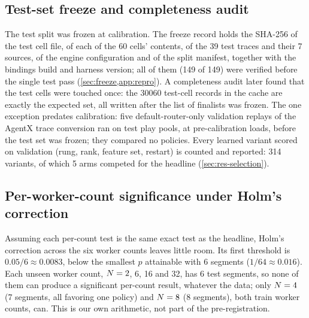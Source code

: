 \subsection{Test-set freeze and completeness audit}

The test split was frozen at calibration. The freeze record holds the SHA-256 of the test cell file,
of each of the 60 cells' contents, of the 39 test traces and their 7 sources, of the engine
configuration and of the split manifest, together with the bindings build and harness version; all
of them (149 of 149) were verified before the single test pass (\cref{sec:freeze,app:repro}).
A completeness audit later found that the test cells were touched once: the \num{30060} test-cell
records in the cache are exactly the expected set, all written after the list of finalists was frozen.
The one exception predates calibration: five default-router-only validation replays of the AgentX
trace conversion ran on test play pools, at pre-calibration loads, before the test set was frozen;
they compared no policies. Every learned variant scored on validation (rung, rank, feature set,
restart) is counted and reported: 314 variants, of which 5 arms competed for the headline
(\cref{sec:res-selection}).

\subsection{Per-worker-count significance under Holm's correction}

Assuming each per-count test is the same exact test as the headline, Holm's correction across the
six worker counts leaves little room. Its first threshold is $0.05/6 \approx 0.0083$, below the
smallest $p$ attainable with 6 segments ($1/64 \approx 0.016$). Each unseen worker count, $N = 2$,
6, 16 and 32, has 6 test segments, so none of them can produce a significant per-count result,
whatever the data; only $N = 4$ (7 segments, all favoring one policy) and $N = 8$ (8 segments),
both train worker counts, can. This is our own arithmetic, not part of the pre-registration.

